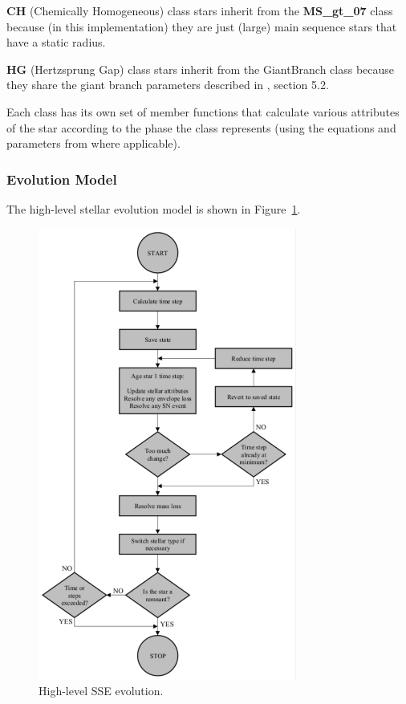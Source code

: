 \medskip
\textbf{CH} (Chemically Homogeneous) class stars inherit from the \textbf{MS\_gt\_07} class because (in this implementation) they are just (large) main sequence stars that have a static radius.

\textbf{HG} (Hertzsprung Gap) class stars inherit from the GiantBranch class because they share the giant branch parameters described in \citet{Hurley_2000}, section 5.2.

Each class has its own set of member functions that calculate various attributes of the star according to the phase the class represents (using the equations and parameters from \citet{Hurley_2000} where applicable).

\newpage
\subsubsection{Evolution Model}\label{sec:SSE_EvolutionModel}

The high-level stellar evolution model is shown in Figure~\ref{fig:SSE_FlowChart}.

\begin{figure}
    \begin{center}
	    \includegraphics[viewport = 0 0 360 632, width = 8.5cm, clip]{sections/images/SSE_FlowChart.pdf}
    \end{center}
    \vspace{-2.00mm}
    \caption{High-level SSE evolution.}
    \label{fig:SSE_FlowChart}
\end{figure}

